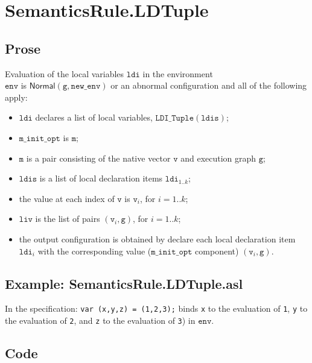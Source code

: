 \documentclass{book}
\newcommand\Normal[0]{\textsf{Normal}}
\newcommand\newenv[0]{\texttt{new\_env}}
\newcommand\env[0]{\texttt{env}}
\newcommand\vg[0]{\texttt{g}}
\newcommand\vm[0]{\texttt{m}}
\newcommand\vv[0]{\texttt{v}}
\newcommand\ldi[0]{\texttt{ldi}}
\newcommand\ldis[0]{\texttt{ldis}}
\newcommand\liv[0]{\texttt{liv}}
\newcommand\minitopt[0]{\texttt{m\_init\_opt}}
\begin{document}
\section{SemanticsRule.LDTuple \label{sec:SemanticsRule.LDTuple}}
    \subsection{Prose}
    Evaluation of the local variables $\ldi$ in the environment \\
    $\env$ is $\Normal(\vg, \newenv)$ or an abnormal configuration
    and all of the following apply:
    \begin{itemize}
    \item $\ldi$ declares a list of local variables, $\texttt{LDI\_Tuple}(\ldis)$;
    \item $\minitopt$ is $\vm$;
    \item $\vm$ is a pair consisting of the native vector $\vv$ and execution graph $\vg$;
    \item $\ldis$ is a list of local declaration items $\ldi_{1..k}$;
    \item the value at each index of $\vv$ is $\vv_i$, for $i=1..k$;
    \item $\liv$ is the list of pairs $(\vv_i, \vg)$, for $i=1..k$;
    \item the output configuration is obtained by declare each local declaration item $\ldi_i$
    with the corresponding value ($\minitopt$ component) $(\vv_i, \vg)$.
    \end{itemize}

    \subsection{Example: SemanticsRule.LDTuple.asl}
    In the specification:
    \texttt{var (x,y,z) = (1,2,3);} binds \texttt{x} to the evaluation of
\texttt{1}, \texttt{y} to the evaluation of \texttt{2}, and \texttt{z} to the
evaluation of \texttt{3}) in $\env$.

  \subsection{Code}
\end{document}
